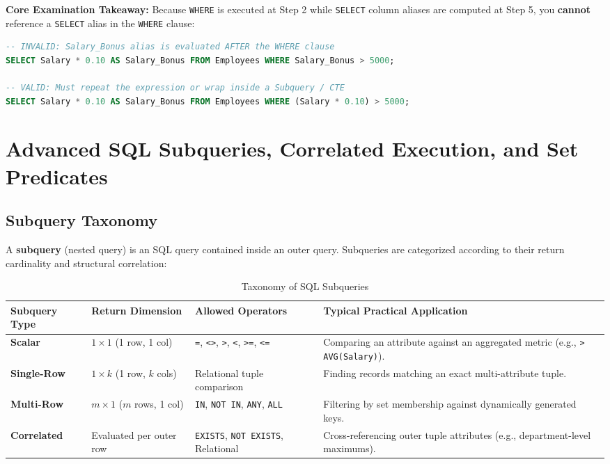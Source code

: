\textbf{Core Examination Takeaway:} Because \texttt{WHERE} is executed at Step 2 while \texttt{SELECT} column aliases are computed at Step 5, you \textbf{cannot} reference a \texttt{SELECT} alias in the \texttt{WHERE} clause:
\begin{lstlisting}[language=SQL]
-- INVALID: Salary_Bonus alias is evaluated AFTER the WHERE clause
SELECT Salary * 0.10 AS Salary_Bonus FROM Employees WHERE Salary_Bonus > 5000;

-- VALID: Must repeat the expression or wrap inside a Subquery / CTE
SELECT Salary * 0.10 AS Salary_Bonus FROM Employees WHERE (Salary * 0.10) > 5000;
\end{lstlisting}

\section{Advanced SQL Subqueries, Correlated Execution, and Set Predicates}
\label{sec:dbms_sql_subqueries}

\subsection{Subquery Taxonomy}
A \textbf{subquery} (nested query) is an SQL query contained inside an outer query. Subqueries are categorized according to their return cardinality and structural correlation:

\begin{table}[htbp]
\centering
\small
\caption{Taxonomy of SQL Subqueries}
\label{tab:sql_subquery_taxonomy}
\begin{tabularx}{\textwidth}{l p{3.2cm} p{4.2cm} X}
\toprule
\textbf{Subquery Type} & \textbf{Return Dimension} & \textbf{Allowed Operators} & \textbf{Typical Practical Application} \\
\midrule
\textbf{Scalar} & $1 \times 1$ (1 row, 1 col) & \texttt{=}, \texttt{<>}, \texttt{>}, \texttt{<}, \texttt{>=}, \texttt{<=} & Comparing an attribute against an aggregated metric (e.g., \texttt{> AVG(Salary)}). \\
\textbf{Single-Row} & $1 \times k$ (1 row, $k$ cols) & Relational tuple comparison & Finding records matching an exact multi-attribute tuple. \\
\textbf{Multi-Row} & $m \times 1$ ($m$ rows, 1 col) & \texttt{IN}, \texttt{NOT IN}, \texttt{ANY}, \texttt{ALL} & Filtering by set membership against dynamically generated keys. \\
\textbf{Correlated} & Evaluated per outer row & \texttt{EXISTS}, \texttt{NOT EXISTS}, Relational & Cross-referencing outer tuple attributes (e.g., department-level maximums). \\
\bottomrule
\end{tabularx}
\end{table}

